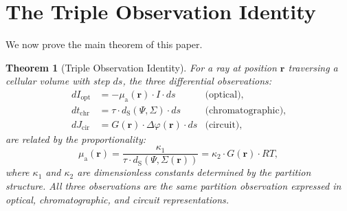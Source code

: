\documentclass[11pt,twocolumn,a4paper]{article}
\newtheorem{theorem}{Theorem}[section]
\newcommand{\dS}{d_{\mathrm{S}}}
\newcommand{\muabs}{\mu_{\mathrm{a}}}
\begin{document}


\section{The Triple Observation Identity}
\label{sec:triple-identity}

We now prove the main theorem of this paper.

\begin{theorem}[Triple Observation Identity]
\label{thm:triple-observation}
For a ray at position $\mathbf{r}$ traversing a cellular volume with
step $ds$, the three differential observations:
\begin{align}
dI_{\mathrm{opt}} &= -\muabs(\mathbf{r}) \cdot I \cdot ds
  & \text{(optical)}, \label{eq:triple-opt} \\
dt_{\mathrm{chr}} &= \tau \cdot \dS(\Psi, \Sigma) \cdot ds
  & \text{(chromatographic)}, \label{eq:triple-chr} \\
dJ_{\mathrm{cir}} &= G(\mathbf{r}) \cdot \Delta\varphi(\mathbf{r})
  \cdot ds & \text{(circuit)}, \label{eq:triple-cir}
\end{align}
are related by the proportionality:
\begin{equation}
\boxed{
\muabs(\mathbf{r}) = \frac{\kappa_1}{\tau \cdot \dS(\Psi,
  \Sigma(\mathbf{r}))} = \kappa_2 \cdot G(\mathbf{r}) \cdot RT,
}
\label{eq:triple-identity}
\end{equation}
where $\kappa_1$ and $\kappa_2$ are dimensionless constants determined
by the partition structure. All three observations are the same
partition observation expressed in optical, chromatographic, and
circuit representations.
\end{theorem}
\end{document}
